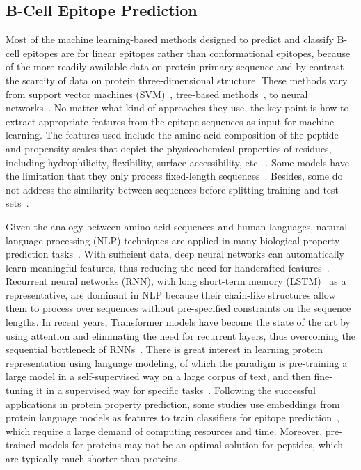 \documentclass[runningheads]{llncs}
\begin{document}
\subsection{B-Cell Epitope Prediction}
Most of the machine learning-based methods designed to predict and classify B-cell epitopes are for linear epitopes rather than conformational epitopes, because of the more readily available data on protein primary sequence and by contrast the scarcity of data on protein three-dimensional structure. These methods vary from support vector machines (SVM)~\cite{bahai2021epitopevec,gupta2013identification,singh2013improved}, tree-based methods~\cite{jespersen2017bepipred,kadam2021antibody,manavalan2018ibce}, to neural networks~\cite{clifford2022bepipred,collatz2021epidope,liu2020deep,xu2022netbce}. No matter what kind of approaches they use, the key point is how to extract appropriate features from the epitope sequences as input for machine learning. The features used include the amino acid composition of the peptide~\cite{bahai2021epitopevec,gupta2013identification,kadam2021antibody,liu2020deep,manavalan2018ibce,singh2013improved} and propensity scales that depict the physicochemical properties of residues, including hydrophilicity, flexibility, surface accessibility, etc.~\cite{jespersen2017bepipred,manavalan2018ibce}. Some models have the limitation that they only process fixed-length sequences~\cite{gupta2013identification,liu2020deep,singh2013improved}. Besides, some do not address the similarity between sequences before splitting training and test sets~\cite{gupta2013identification,kadam2021antibody,liu2020deep}.

Given the analogy between amino acid sequences and human languages, natural language processing (NLP) techniques are applied in many biological property prediction tasks~\cite{ma2022identification,ofer2021language,teufel2022signalp,thumuluri2022deeploc}. With sufficient data, deep neural networks can automatically learn meaningful features, thus reducing the need for handcrafted features~\cite{lecun2015deep}. Recurrent neural networks (RNN), with long short-term memory (LSTM)~\cite{hochreiter1997long} as a representative, are dominant in NLP because their chain-like structures allow them to process over sequences without pre-specified constraints on the sequence lengths. In recent years, Transformer models have become the state of the art by using attention and eliminating the need for recurrent layers, thus overcoming the sequential bottleneck of RNNs~\cite{vaswani2017attention}. There is great interest in learning protein representation using language modeling, of which the paradigm is pre-training a large model in a self-supervised way on a large corpus of text, and then fine-tuning it in a supervised way for specific tasks~\cite{devlin2019bert}. Following the successful applications in protein property prediction, some studies use embeddings from protein language models as features to train classifiers for epitope prediction~\cite{bahai2021epitopevec,clifford2022bepipred,collatz2021epidope}, which require a large demand of computing resources and time. Moreover, pre-trained models for proteins may not be an optimal solution for peptides, which are typically much shorter than proteins.
\end{document}
